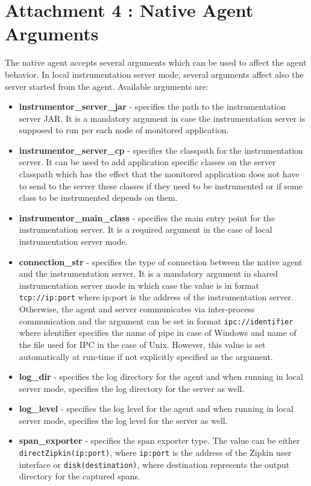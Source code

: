 \chapter*{Attachment 4 : Native Agent Arguments}
\setcounter{page}{1}
The native agent accepts several arguments which can be used to affect the agent behavior. In local instrumentation server mode, several arguments affect also the server started from the agent. Available arguments are:
\begin{itemize}
	\item \textbf{instrumentor\_server\_jar} - specifies the path to the instrumentation server JAR. It is a mandatory argument in case the instrumentation server is supposed to run per each node of monitored application.
	\item \textbf{instrumentor\_server\_cp} - specifies the classpath for the instrumentation server. It can be used to add application specific classes on the server classpath which has the effect that the monitored application does not have to send to the server these classes if they need to be instrumented or if some class to be instrumented depends on them.
	\item \textbf{instrumentor\_main\_class} - specifies the main entry point for the instrumentation server. It is a required argument in the case of local instrumentation server mode.
	\item \textbf{connection\_str} - specifies the type of connection between the native agent and the instrumentation server. It is a mandatory argument in shared instrumentation server mode in which case the value is in format \texttt{tcp://ip:port} where ip:port is the address of the instrumentation server. Otherwise, the agent and server communicates via inter-process communication and the argument can be set in format \texttt{ipc://identifier} where identifier specifies the name of pipe in case of Windows and name of the file used for IPC in the case of Unix. However, this value is set automatically at run-time if not explicitly specified as the argument.
	\item \textbf{log\_dir} - specifies the log directory for the agent and when running in local server mode, specifies the log directory for the server as well.
	\item \textbf{log\_level} - specifies the log level for the agent and when running in local server mode, specifies the log level for the server as well.
	\item \textbf{span\_exporter} - specifies the span exporter type. The value can be either \linebreak \texttt{directZipkin(ip:port)}, where \texttt{ip:port} is the address of the Zipkin user interface or \texttt{disk(destination)}, where destination represents the output directory for the captured spans. 
	

\end{itemize}
